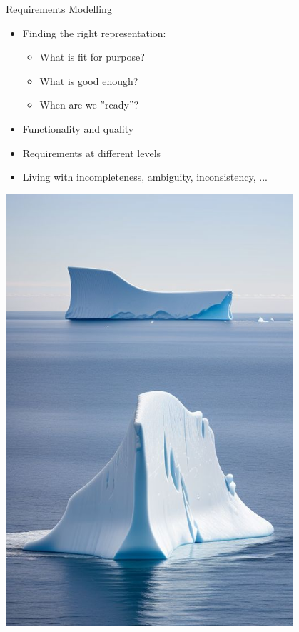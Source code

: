 \documentclass{simpleslides}
\begin{document}
\begin{frame}[fragile]{Requirements Modelling}
\begin{minipage}[t]{0.6\textwidth}
\vspace{0pt}
\begin{itemize}
\item Finding the right representation:
\begin{itemize}
\item What is fit for purpose?
\item What is good enough?
\item When are we ''ready''?
\end{itemize}
\item Functionality and quality
\item Requirements at different levels
\item Living with incompleteness, ambiguity, inconsistency, ...
\end{itemize}
\end{minipage}%
\begin{minipage}[t]{0.4\textwidth}
\vspace{0pt}
\hfill\includegraphics[width=0.8\textwidth]{img/iceberg4}
\end{minipage}%
\end{frame}
\end{document}
